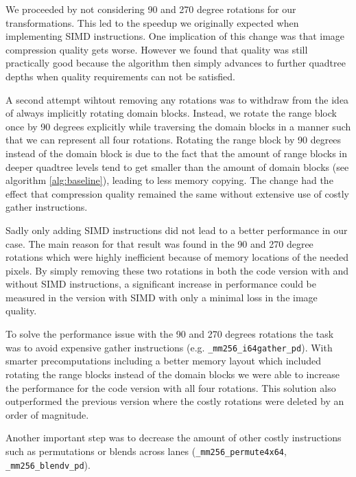 We proceeded by not considering 90 and 270 degree rotations for our transformations. 
This led to the speedup we originally expected when implementing SIMD instructions.
One implication of this change was that image compression quality gets worse. However we found that quality
was still practically good because the algorithm then simply advances to further quadtree
depths when quality requirements can not be satisfied.

A second attempt wihtout removing any rotations was to withdraw from the idea of always implicitly rotating domain blocks.
Instead, we rotate the range block once by 90 degrees explicitly while traversing the domain blocks
in a manner such that we can represent all four rotations.
Rotating the range block by 90 degrees instead of the domain block is due to the fact that the amount of range blocks 
in deeper quadtree levels tend to get smaller than the amount of domain blocks (see algorithm \ref{alg:baseline}), 
leading to less memory copying.
The change had the effect that compression quality remained the same without extensive use of costly
gather instructions.

Sadly only adding SIMD instructions did not lead to a better performance in our
case. The main reason for that result was found in the 90 and 270 degree
rotations which were highly inefficient because of memory locations of the
needed pixels. By simply removing these two rotations in both the code version
with and without SIMD instructions, a significant increase in performance could
be measured in the version with SIMD with only a minimal loss in the image
quality.

To solve the performance issue with the 90 and 270 degrees rotations the task
was to avoid expensive gather instructions (e.g. \verb|_mm256_i64gather_pd|).
With smarter precomputations including a better memory layout which included
rotating the range blocks instead of the domain blocks we were able to increase
the performance for the code version with all four rotations. This solution also
outperformed the previous version where the costly rotations were deleted by an
order of magnitude.

Another important step was to decrease the amount of other costly instructions
such as permutations or blends across lanes (\verb|_mm256_permute4x64|,
\verb|_mm256_blendv_pd|).
